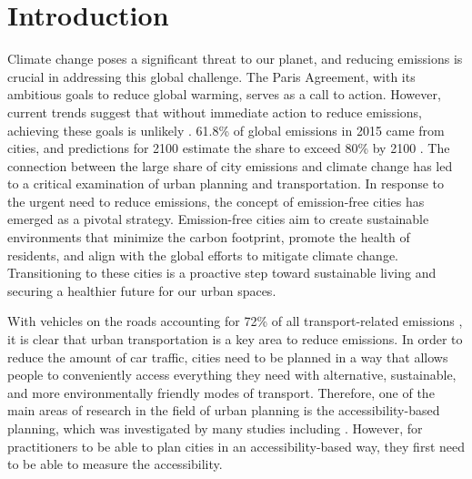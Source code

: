 \clearpage
\section{Introduction}
\label{sec:introduction}




Climate change poses a significant threat to our planet, and reducing emissions is crucial in addressing this global challenge.
The Paris Agreement, with its ambitious goals to reduce global warming, serves as a call to action.
However, current trends suggest that without immediate action to reduce emissions, achieving these goals is unlikely .
61.8\% of global emissions in 2015 came from cities, and predictions for 2100 estimate the share to exceed 80\% by 2100 .
The connection between the large share of city emissions and climate change has led to a critical examination of urban planning and transportation.
In response to the urgent need to reduce emissions, the concept of emission-free cities has emerged as a pivotal strategy.
Emission-free cities aim to create sustainable environments that minimize the carbon footprint, promote the health of residents, and align with the global efforts to mitigate climate change.
Transitioning to these cities is a proactive step toward sustainable living and securing a healthier future for our urban spaces.


With vehicles on the roads accounting for 72\% of all transport-related emissions , it is clear that urban transportation is a key area to reduce emissions.
In order to reduce the amount of car traffic, cities need to be planned in a way that allows people to conveniently access everything they need with alternative, sustainable, and more environmentally friendly modes of transport.
Therefore, one of the main areas of research in the field of urban planning is the accessibility-based planning, which was investigated by many studies including .
However, for practitioners to be able to plan cities in an accessibility-based way, they first need to be able to measure the accessibility.


